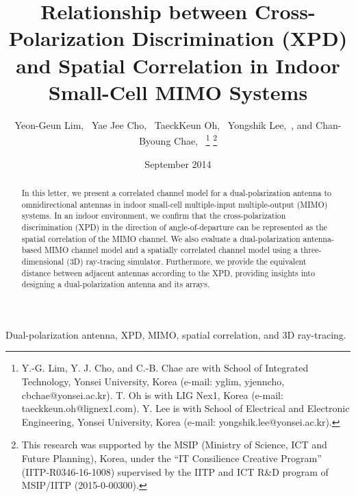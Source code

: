 \documentclass[journal]{IEEEtran}
\date{September 2014}
\begin{document}
\title{Relationship between Cross-Polarization Discrimination (XPD) and Spatial Correlation in Indoor Small-Cell MIMO Systems}

\author{Yeon-Geun Lim,~ Yae Jee Cho,~ TaeckKeun Oh,~ Yongshik Lee,~, and Chan-Byoung Chae,~
\thanks{Y.-G. Lim, Y. J. Cho, and C.-B. Chae are with School of Integrated Technology, Yonsei University, Korea (e-mail: {yglim, yjenncho, cbchae}@yonsei.ac.kr). T. Oh is with LIG Nex1, Korea (e-mail: taeckkeun.oh@lignex1.com). Y. Lee is with School of Electrical and Electronic Engineering, Yonsei University, Korea (e-mail: yongshik.lee@yonsei.ac.kr).}
\thanks{This research was supported by the MSIP (Ministry of Science, ICT and Future Planning), Korea, under the ``IT Consilience Creative Program'' (IITP-R0346-16-1008) supervised by the IITP and ICT R\&D program of MSIP/IITP (2015-0-00300).}
} 



\maketitle

\begin{abstract}
	
In this letter, we present a correlated channel model for a dual-polarization antenna to omnidirectional antennas in indoor small-cell multiple-input multiple-output (MIMO) systems. In an indoor environment, we confirm that the cross-polarization discrimination (XPD) in the direction of angle-of-departure can be represented as the spatial correlation of the MIMO channel. We also evaluate a dual-polarization antenna-based MIMO channel model and a spatially correlated channel model using a three-dimensional (3D) ray-tracing simulator. Furthermore, we provide the equivalent distance between adjacent antennas according to the XPD, providing insights into designing a dual-polarization antenna and its arrays.\\
\end{abstract}

\begin{IEEEkeywords}
	Dual-polarization antenna, XPD, MIMO, spatial correlation, and 3D ray-tracing.
\end{IEEEkeywords}


\end{document}
